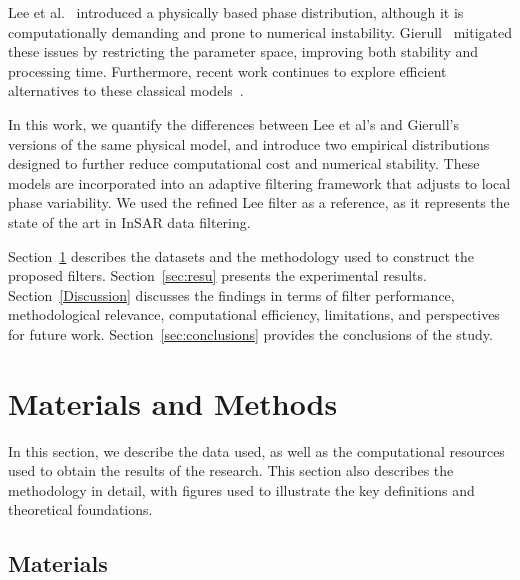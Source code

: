 \documentclass[remotesensing,article,submit,pdftex,moreauthors]{Definitions/mdpi}
\begin{document}
Lee et al.~\cite{IntensityAndPhaseStatisticsOfMultilookPolarimetricAndInterferometricSARimagery} introduced a physically based phase distribution, although it is computationally demanding and prone to numerical instability. 
Gierull~\cite{ClosedFormExpressionsforInSARSampleStatisticsandItsApplicationtoNonGaussianData} mitigated these issues by restricting the parameter space, improving both stability and processing time. 
Furthermore, recent work continues to explore efficient alternatives to these classical models~\citep{AngularConsistencyAdaptiveFilteringandComplexGeneralizedGaussianBasedPhaseLinkingforDSInSAR,CLTCPLaRobustMathematicalFrameworkandAlgorithmforInSARPhaseLinkingUsingtheCentralLimitTheoremofCircularStatistics}.

In this work, we quantify the differences between Lee et al's and Gierull's versions of the same physical model, and introduce two empirical distributions designed to further reduce computational cost and numerical stability.
These models are incorporated into an adaptive filtering framework that adjusts to local phase variability.
We used the refined Lee filter as a reference, as it represents the state of the art in InSAR data filtering. 


Section~\ref{sec:mat_meth} describes the datasets and the methodology used to construct the proposed filters.
Section~\ref{sec:resu} presents the experimental results.
Section~\ref{Discussion} discusses the findings in terms of filter performance, methodological relevance, computational efficiency, limitations, and perspectives for future work.
Section~\ref{sec:conclusions} provides the conclusions of the study.

\section{Materials and Methods}\label{sec:mat_meth}

In this section, we describe the data used, as well as the computational resources used to obtain the results of the research. 
This section also describes the methodology in detail, with figures used to illustrate the key definitions and theoretical foundations.

\subsection{Materials}\label{subsec:materials}
\end{document}
